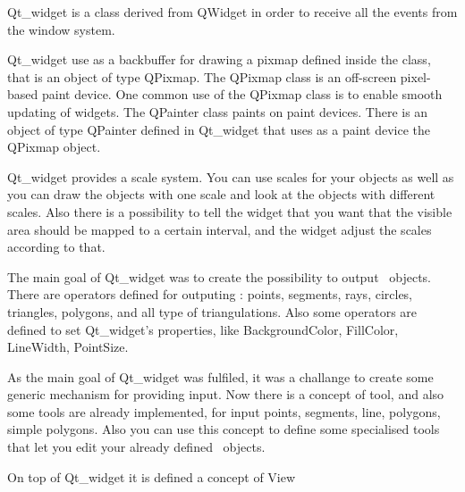 Qt\_widget is a class derived from QWidget in order to receive all the events
from the window system.

Qt\_widget use as a backbuffer for drawing a pixmap
defined inside the class, that is an object of type QPixmap. The QPixmap class
is an off-screen pixel-based paint device. One common use of the QPixmap class
is to enable smooth updating of widgets.
The QPainter class paints on paint devices. There is an object of type 
QPainter defined in Qt\_widget that uses as a paint device the QPixmap object.

Qt\_widget provides a scale system. You can use scales for your objects as 
well as you can draw the objects with one scale and look at the objects with 
different scales. Also there is a possibility to tell the widget that you
want that the visible area should be mapped to a certain interval, and the 
widget adjust the scales according to that.

The main goal of Qt\_widget was to create the possibility to output \cgal\ 
objects. There are operators defined for outputing : points, segments, 
rays, circles, triangles, polygons, and all type of triangulations. Also some
operators are defined to set Qt\_widget's properties, like BackgroundColor,
FillColor, LineWidth, PointSize.

As the main goal of Qt\_widget was fulfiled, it was a challange to create some
generic mechanism for providing input. Now there is a concept of tool, and
 also some tools are already implemented, for input points, segments, line, 
polygons, simple polygons. Also you can use this concept to define some 
specialised tools that let you edit your already defined \cgal\ objects.

On top of Qt\_widget it is defined a concept of View 

